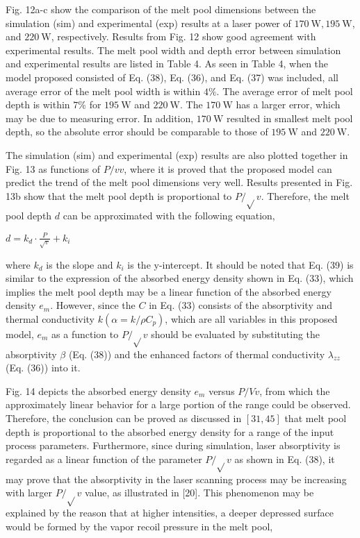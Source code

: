 \documentclass[10pt]{article}
\begin{document}
Fig. 12a-c show the comparison of the melt pool dimensions between the simulation (sim) and experimental (exp) results at a laser power of $170 \mathrm{~W}, 195 \mathrm{~W}$, and $220 \mathrm{~W}$, respectively. Results from Fig. 12 show good agreement with experimental results. The melt pool width and depth error between simulation and experimental results are listed in Table 4. As seen in Table 4, when the model proposed consisted of Eq. (38), Eq. (36), and Eq. (37) was included, all average error of the melt pool width is within $4 \%$. The average error of melt pool depth is within $7 \%$ for $195 \mathrm{~W}$ and $220 \mathrm{~W}$. The $170 \mathrm{~W}$ has a larger error, which may be due to measuring error. In addition, $170 \mathrm{~W}$ resulted in smallest melt pool depth, so the absolute error should be comparable to those of $195 \mathrm{~W}$ and $220 \mathrm{~W}$.

The simulation (sim) and experimental (exp) results are also plotted together in Fig. 13 as functions of $P / v v$, where it is proved that the proposed model can predict the trend of the melt pool dimensions very well. Results presented in Fig. 13b show that the melt pool depth is proportional to $P / \sqrt{ } v$. Therefore, the melt pool depth $d$ can be approximated with the following equation,

$d=k_{d} \cdot \frac{P}{\sqrt{v}}+k_{i}$

where $k_{d}$ is the slope and $k_{i}$ is the y-intercept. It should be noted that Eq. (39) is similar to the expression of the absorbed energy density shown in Eq. (33), which implies the melt pool depth may be a linear function of the absorbed energy density $e_{m}$. However, since the $C$ in Eq. (33) consists of the absorptivity and thermal conductivity $k\left(\alpha=k / \rho C_{p}\right)$, which are all variables in this proposed model, $e_{m}$ as a function to $P / \sqrt{ } v$ should be evaluated by substituting the absorptivity $\beta$ (Eq. (38)) and the enhanced factors of thermal conductivity $\lambda_{z z}$ (Eq. (36)) into it.

Fig. 14 depicts the absorbed energy density $e_{m}$ versus $P / V v$, from which the approximately linear behavior for a large portion of the range could be observed. Therefore, the conclusion can be proved as discussed in $[31,45]$ that melt pool depth is proportional to the absorbed energy density for a range of the input process parameters. Furthermore, since during simulation, laser absorptivity is regarded as a linear function of the parameter $P / \sqrt{ } v$ as shown in Eq. (38), it may prove that the absorptivity in the laser scanning process may be increasing with larger $P / \sqrt{ } v$ value, as illustrated in [20]. This phenomenon may be explained by the reason that at higher intensities, a deeper depressed surface would be formed by the vapor recoil pressure in the melt pool,
\end{document}

